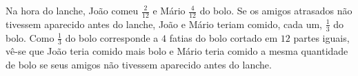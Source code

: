 \documentclass[10 pt,usenames,dvipsnames, oneside]{article}
\begin{document}
\ifdefined\prof
\begin{solucao}

Na hora do lanche, João comeu   $\frac{2}{12}$   e Mário   $\frac{4}{12}$   do
bolo. Se os amigos atrasados não tivessem aparecido antes do lanche, João e
Mário teriam comido, cada um,   $\frac{1}{3}$   do bolo. Como   $\frac{1}{3}$
do bolo corresponde a   $4$   fatias do bolo cortado em   $12$   partes iguais,
vê-se que João teria comido mais bolo e Mário teria comido a mesma quantidade de
bolo se seus amigos não tivessem aparecido antes do lanche.

\end{solucao}
\fi
\end{document}
